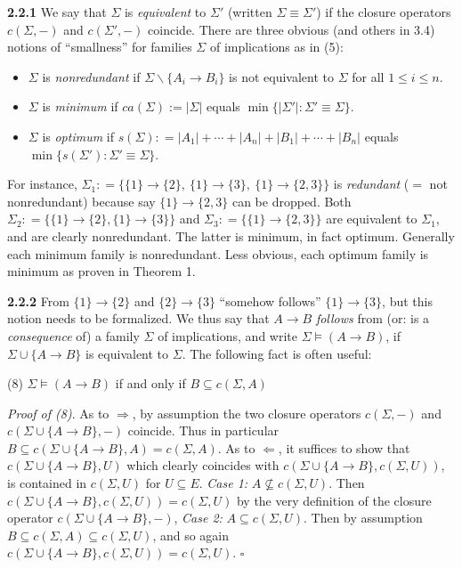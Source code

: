 \documentclass[11pt]{article}
\newcommand{\ra}{\rightarrow}
\newcommand{\Ra}{\Rightarrow}
\begin{document}
{\bf 2.2.1}  We say that $\Sigma$ is {\it equivalent} to $\Sigma'$ (written $\Sigma \equiv \Sigma'$) if the closure operators $c(\Sigma, -)$ and $c(\Sigma', -)$ coincide. There are three obvious (and others in 3.4) notions of ``smallness'' for families $\Sigma$ of implications as in (5):
\begin{itemize}
	\item $\Sigma$ is {\it nonredundant} if $\Sigma \backslash \{A_i \ra B_i\}$ is not equivalent to $\Sigma$ for all $1 \leq i \leq n$.
	\item $\Sigma$ is {\it minimum} if $ca (\Sigma):=|\Sigma|$ equals $\min \{  |\Sigma'|: \Sigma' \equiv \Sigma  \}$.
	\item $\Sigma$ is {\it optimum} if  $s(\Sigma) : = |A_1 | + \cdots +|A_n| + |B_1| + \cdots + |B_n|$ equals\\
	 $\min \{s(\Sigma') : \Sigma' \equiv \Sigma \}$.
\end{itemize}
For instance, $\Sigma_1 : = \{\{1\} \ra \{2\}, \ \{1 \} \ra \{3\}, \ \{1\} \ra \{2,3\} \}$ is {\it redundant} ($=$ not nonredundant) because say $\{1\} \ra \{2,3\}$ can be dropped. 
Both $\Sigma_2 : = \{\{1\} \ra \{2\}, \{1\} \ra \{3\} \}$ and $\Sigma_3: = \{\{1\} \ra \{2, 3\} \}$ are equivalent to $\Sigma_1$, and are clearly nonredundant. The latter is minimum, in fact optimum. Generally each minimum family is nonredundant. Less obvious, each optimum family is minimum as proven in Theorem 1. 


{\bf 2.2.2} From $\{1\} \ra \{2\}$ and $\{2\} \ra \{3\}$ ``somehow follows'' $\{1\} \ra \{3\}$, but this notion needs to be formalized. We thus say that $A \ra B$ {\it follows} from (or: is a {\it consequence} of) a family $\Sigma$ of implications, and write $\Sigma \vDash (A \ra B)$, if $\Sigma \cup \{A \ra B\}$ is equivalent to $\Sigma$. The following fact is often useful:

(8) \quad $\Sigma \vDash (A \ra B)$ if and only if $B \subseteq c(\Sigma, A)$

{\it Proof of (8)}. As to $\Ra$, by assumption the two closure operators $c(\Sigma, -)$ and $c(\Sigma \cup \{A \ra B\}, -)$ coincide. Thus in particular $B \subseteq c(\Sigma \cup \{A \ra B\}, A) = c(\Sigma, A)$. As to $\Leftarrow$, it suffices to show that $c(\Sigma \cup \{A \ra B\}, U)$ which clearly coincides with $c(\Sigma \cup \{A \ra B\}, c(\Sigma, U))$, is contained in $c(\Sigma, U)$ for $U \subseteq E$. {\it Case 1:} $A \not\subseteq c(\Sigma, U)$. Then $c(\Sigma \cup \{A \ra B\}, c(\Sigma, U)) = c(\Sigma, U)$ by the very definition of the closure operator $c(\Sigma \cup \{A \ra B\}, -)$, {\it Case 2:} $A \subseteq c(\Sigma, U)$. Then by assumption $B \subseteq c(\Sigma, A) \subseteq c(\Sigma, U)$, and so again $c(\Sigma \cup \{A \ra B\}, c(\Sigma, U)) = c(\Sigma, U)$. \quad $\square$
\end{document}
